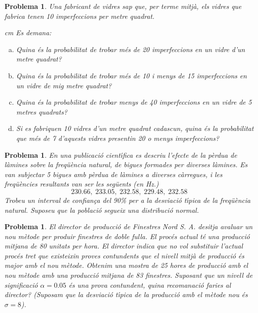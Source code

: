 \documentclass[a4paper,12pt]{article}
\newcounter{prbcont}
\newtheorem{problema}[prbcont]{Problema}
\begin{document}
\newpage

\begin{problema}
Una fabricant de vidres sap que, per terme mitjà, els vidres que fabrica tenen 10 imperfeccions per metre quadrat.

 cm
Es demana:

\begin{enumerate}[a)]
\item Quina és la probabilitat de trobar més de 20 imperfeccions en un vidre d'un metre quadrat?
\item Quina és la probabilitat de trobar més de 10 i menys de 15 imperfeccions en un vidre de mig metre quadrat?
\item Quina és la probabilitat de trobar menys de 40 imperfeccions en un vidre de 5 metres quadrats?
\item Si es fabriquen 10 vidres d'un metre quadrat cadascun, quina és la probabilitat que més de 7 d'aquests 
vidres presentin 20 o menys imperfeccions?
\end{enumerate}
\end{problema}

\vskip 0.5cm

\begin{problema}
En una publicaci\'o cient\'{\i}fica es descriu l'efecte de la p\`erdua de l\`amines sobre la freq\"u\`encia natural, de bigues formades per diverses l\`amines. Es van subjectar 5 bigues amb p\`erdua de l\`amines a diverses c\`arregues, i les freq\"u\`encies resultants van ser les seg\"uents (en Hz.)
\[
230.66,\;233.05,\;232.58,\;229.48,\; 232.58
\]
Trobeu un interval de confian\c{c}a del 90\% per a la desviaci\'o t\'{\i}pica de la freq\"u\`encia natural. Suposeu que la poblaci\'o segueix
una distribuci\'o normal.
\end{problema}

\vskip 0.5cm

\begin{problema}
El director de producci\'o de Finestres Nord S. A. desitja avaluar un nou m\`etode per produir finestres de doble fulla. El proc\'es actual t\'e una producci\'o mitjana de 80 unitats per hora. El director indica que no vol substituir l'actual proc\'es tret que existeixin proves contundents que el nivell mitj\`a de producci\'o \'es major amb el nou m\`etode. Obtenim una mostra de 25 hores de producci\'o amb el nou m\`etode amb una producci\'o mitjana de 83 finestres. Suposant que un nivell de significaci\'o $\alpha=0.05$ \'es una prova contundent, quina recomanaci\'o faries al director? (Suposam que la desviaci\'o t\'{\i}pica de la producci\'o amb el m\`etode nou
\'es $\sigma=8$).
\end{problema}
\end{document}

